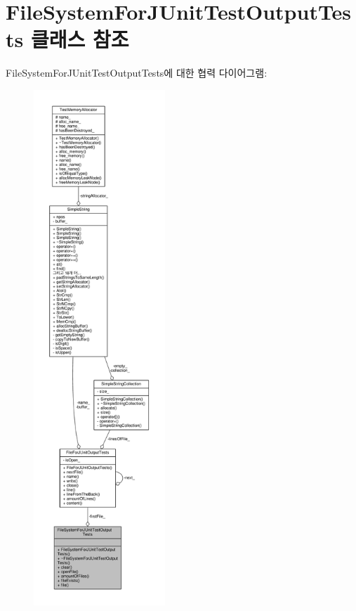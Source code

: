 \hypertarget{class_file_system_for_j_unit_test_output_tests}{}\section{File\+System\+For\+J\+Unit\+Test\+Output\+Tests 클래스 참조}
\label{class_file_system_for_j_unit_test_output_tests}


File\+System\+For\+J\+Unit\+Test\+Output\+Tests에 대한 협력 다이어그램\+:
\nopagebreak
\begin{figure}[H]
\begin{center}
\leavevmode
\includegraphics[height=550pt]{class_file_system_for_j_unit_test_output_tests__coll__graph}
\end{center}
\end{figure}

